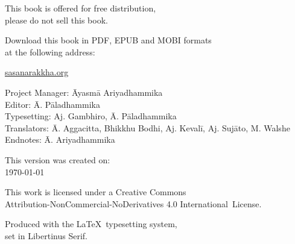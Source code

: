 \cleartoverso
\thispagestyle{empty}

\vspace*{-\baselineskip}

{%

\fontsize{9}{11}\selectfont
\centering
\setlength{\parindent}{0pt}%
\setlength{\parskip}{0.8\baselineskip}%


This book is offered for free distribution,\\
please do not sell this book.

Download this book in PDF, EPUB and MOBI formats\\
at the following address:

\href{https://sasanarakkha.org/}{sasanarakkha.org}

\vfill


Project Manager: Āyasmā Ariyadhammika\\
Editor: Ā. Pāladhammika\\
Typesetting: Aj. Gambhiro, Ā. Pāladhammika\\
Translators: Ā. Aggacitta, Bhikkhu Bodhi, Aj. Kevalī, Aj. Sujāto, M. Walshe\\
Endnotes: Ā. Ariyadhammika


\vfill

This version was created on:\\
\today\\
\currenttime

\vfill

This work is licensed under a Creative Commons\\
Attribution-NonCommercial-NoDerivatives 4.0 International~License.

Produced with the \LaTeX\ typesetting system,\\
set in Libertinus Serif.

\theEditionInfo

}
